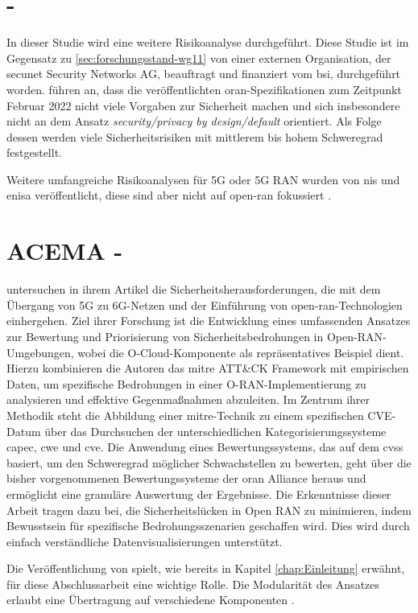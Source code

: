 \section{ - \citeauthor{kopsellOpenRANRisikoanalyse2022}}
\label{sec:forschungsstand-bsi}
In dieser Studie wird eine weitere Risikoanalyse durchgeführt. Diese Studie ist im Gegensatz zu \ref{sec:forschungsstand-wg11} von einer externen Organisation, der secunet Security Networks AG, beauftragt und finanziert vom \gls{bsi}, durchgeführt worden. \citeauthor{kopsellOpenRANRisikoanalyse2022} führen an, dass die veröffentlichten \gls{oran}-Spezifikationen zum Zeitpunkt Februar 2022 nicht viele Vorgaben zur Sicherheit machen und sich insbesondere nicht an dem Ansatz \textit{security/privacy by design/default} orientiert. Als Folge dessen werden viele Sicherheitsrisiken mit mittlerem bis hohem Schweregrad festgestellt.
\par Weitere umfangreiche Risikoanalysen für 5G oder 5G RAN wurden von \gls{nis} und \gls{enisa} veröffentlicht, diese sind aber nicht auf \gls{open-ran} fokussiert \autocite{europeanunionagencyfornetworkandinformationsecurity.ENISAThreatLandscape2019} \autocite{EUCoordinatedRisk}.
%
\section{\glqq{}ACEMA\grqq{} - \citeauthor{klementSecuring6GTransition2024}}
\label{sec:forschungsstand-acema}
\citeauthor{klementSecuring6GTransition2024} untersuchen in ihrem Artikel  die Sicherheitsherausforderungen, die mit dem Übergang von 5G zu 6G-Netzen und der Einführung von \gls{open-ran}-Technologien einhergehen. Ziel ihrer Forschung ist die Entwicklung eines umfassenden Ansatzes zur Bewertung und Priorisierung von Sicherheitsbedrohungen in Open-RAN-Umgebungen, wobei die O-Cloud-Komponente als repräsentatives Beispiel dient. Hierzu kombinieren die Autoren das \gls{mitre} ATT\&CK Framework mit empirischen Daten, um spezifische Bedrohungen in einer O-RAN-Implementierung zu analysieren und effektive Gegenmaßnahmen abzuleiten. Im Zentrum ihrer Methodik steht die Abbildung einer \gls{mitre}-Technik zu einem spezifischen CVE-Datum über das Durchsuchen der unterschiedlichen Kategorisierungssysteme \gls{capec}, \gls{cwe} und \gls{cve}. Die Anwendung eines Bewertungssystems, das auf dem \gls{cvss} basiert, um den Schweregrad möglicher Schwachstellen zu bewerten, geht über die bisher vorgenommenen Bewertungssysteme der \gls{oran} Alliance heraus und ermöglicht eine granuläre Auswertung der Ergebnisse. Die Erkenntnisse dieser Arbeit tragen dazu bei, die Sicherheitslücken in Open RAN zu minimieren, indem Bewusstsein für spezifische Bedrohungsszenarien geschaffen wird. Dies wird durch einfach verständliche Datenvisualisierungen unterstützt.
\par Die Veröffentlichung von \citeauthor{klementSecuring6GTransition2024} spielt, wie bereits in Kapitel \ref{chap:Einleitung} erwähnt, für diese Abschlussarbeit eine wichtige Rolle. Die Modularität des Ansatzes erlaubt eine Übertragung auf verschiedene Komponenten \autocite{klementSecuring6GTransition2024}.

